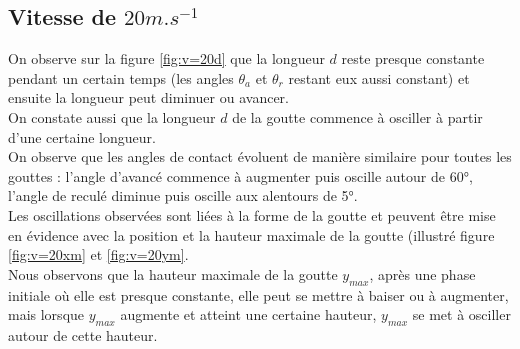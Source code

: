 \newpage
\subsection{Vitesse de $20m.s^{-1}$}

On observe sur la figure \ref{fig:v=20d} que la longueur $d$ reste presque constante pendant un certain temps (les angles $\theta_{a}$ et $\theta_{r}$ restant eux aussi constant) et ensuite la longueur peut diminuer ou avancer.\\

On constate aussi que la longueur $d$ de la goutte commence à osciller à partir d'une certaine longueur.\\

On observe que les angles de contact évoluent de manière similaire pour toutes les gouttes : l'angle d'avancé commence à augmenter puis oscille autour de \ang{60}, l'angle de reculé diminue puis oscille aux alentours de \ang{5}.\\

Les oscillations observées sont liées à la forme de la goutte et peuvent être mise en évidence avec la position et la hauteur maximale de la goutte (illustré figure \ref{fig:v=20xm} et \ref{fig:v=20ym}.\\

Nous observons que la hauteur maximale de la goutte $y_{max}$, après une phase initiale où elle est presque constante, elle peut se mettre à baiser ou à augmenter, mais lorsque $y_{max}$ augmente et atteint une certaine hauteur, $y_{max}$ se met à osciller autour de cette hauteur.

